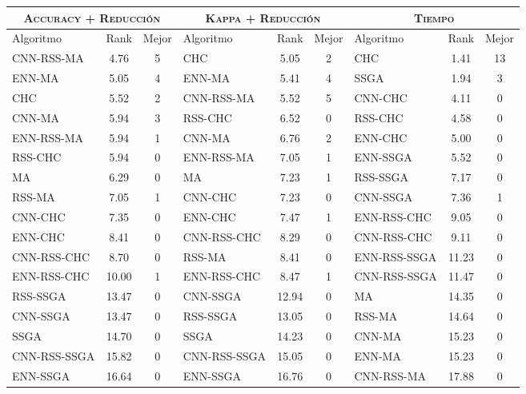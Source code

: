 \begin{table}[h!]
\centering
\begin{adjustbox}{max width =\textwidth}
\begin{tabular}{l c c|l c c|l c c}
\hline
\multicolumn{3}{c|}{\textsc{Accuracy + Reducción}}
	& \multicolumn{3}{c|}{\textsc{Kappa + Reducción}}
	& \multicolumn{3}{c}{\textsc{Tiempo}} \\
\hline
Algoritmo & Rank & Mejor & Algoritmo & Rank & Mejor & Algoritmo & Rank & Mejor \\
\hline
\hline

CNN-RSS-MA   & 4.76  & 5 & CHC          & 5.05  & 2  &  CHC          & 1.41 & 13 \\
ENN-MA       & 5.05  & 4 & ENN-MA       & 5.41  & 4  &  SSGA         & 1.94 & 3 \\
CHC          & 5.52  & 2 & CNN-RSS-MA   & 5.52  & 5  &  CNN-CHC      & 4.11 & 0 \\
CNN-MA       & 5.94  & 3 & RSS-CHC      & 6.52  & 0  &  RSS-CHC      & 4.58 & 0 \\
ENN-RSS-MA   & 5.94  & 1 & CNN-MA       & 6.76  & 2  &  ENN-CHC      & 5.00 & 0 \\
RSS-CHC      & 5.94  & 0 & ENN-RSS-MA   & 7.05  & 1  &  ENN-SSGA     & 5.52 & 0 \\
MA           & 6.29  & 0 & MA           & 7.23  & 1  &  RSS-SSGA     & 7.17 & 0 \\
RSS-MA       & 7.05  & 1 & CNN-CHC      & 7.23  & 0  &  CNN-SSGA     & 7.36 & 1 \\
CNN-CHC      & 7.35  & 0 & ENN-CHC      & 7.47  & 1  &  ENN-RSS-CHC  & 9.05 & 0 \\
ENN-CHC      & 8.41  & 0 & CNN-RSS-CHC  & 8.29  & 0  &  CNN-RSS-CHC  & 9.11 & 0 \\
CNN-RSS-CHC  & 8.70  & 0 & RSS-MA       & 8.41  & 0  &  ENN-RSS-SSGA & 11.23 & 0 \\
ENN-RSS-CHC  & 10.00 & 1 & ENN-RSS-CHC  & 8.47  & 1  &  CNN-RSS-SSGA & 11.47 & 0 \\
RSS-SSGA     & 13.47 & 0 & CNN-SSGA     & 12.94 & 0  &  MA           & 14.35 & 0 \\
CNN-SSGA     & 13.47 & 0 & RSS-SSGA     & 13.05 & 0  &  RSS-MA       & 14.64 & 0 \\
SSGA         & 14.70 & 0 & SSGA         & 14.23 & 0  &  CNN-MA       & 15.23 & 0 \\
CNN-RSS-SSGA & 15.82 & 0 & CNN-RSS-SSGA & 15.05 & 0  &  ENN-MA       & 15.23 & 0 \\
ENN-SSGA     & 16.64 & 0 & ENN-SSGA     & 16.76 & 0  &  CNN-RSS-MA   & 17.88 & 0 \\

\end{tabular}
\end{adjustbox}
\end{table}
